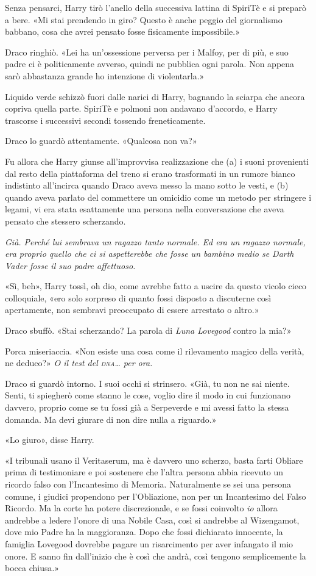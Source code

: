 Senza pensarci, Harry tirò l’anello della successiva lattina di SpiriTè e si preparò a bere. «Mi stai prendendo in giro? Questo è anche peggio del giornalismo babbano, cosa che avrei pensato fosse fisicamente impossibile.»

Draco ringhiò. «Lei ha un’ossessione perversa per i Malfoy, per di più, e suo padre ci è politicamente avverso, quindi ne pubblica ogni parola. Non appena sarò abbastanza grande ho intenzione di violentarla.»

Liquido verde schizzò fuori dalle narici di Harry, bagnando la sciarpa che ancora copriva quella parte. SpiriTè e polmoni non andavano d’accordo, e Harry trascorse i successivi secondi tossendo freneticamente.

Draco lo guardò attentamente. «Qualcosa non va?»

Fu allora che Harry giunse all’improvvisa realizzazione che (a) i suoni provenienti dal resto della piattaforma del treno si erano trasformati in un rumore bianco indistinto all’incirca quando Draco aveva messo la mano sotto le vesti, e (b) quando aveva parlato del commettere un omicidio come un metodo per stringere i legami, vi era stata esattamente una persona nella conversazione che aveva pensato che stessero scherzando.

\textit{Già. Perché lui sembrava un ragazzo tanto normale. Ed era un ragazzo normale, era proprio quello che ci si aspetterebbe che fosse un bambino medio se Darth Vader fosse il suo padre affettuoso.}

«Sì, beh», Harry tossì, oh dio, come avrebbe fatto a uscire da questo vicolo cieco colloquiale, «ero solo sorpreso di quanto fossi disposto a discuterne così apertamente, non sembravi preoccupato di essere arrestato o altro.»

Draco sbuffò. «Stai scherzando? La parola di \textit{Luna Lovegood} contro la mia?»

Porca miseriaccia. «Non esiste una cosa come il rilevamento magico della verità, ne deduco?» \textit{O il test del \textsc{dna}… per ora.}

Draco si guardò intorno. I suoi occhi si strinsero. «Già, tu non ne sai niente. Senti, ti spiegherò come stanno le cose, voglio dire il modo in cui funzionano davvero, proprio come se tu fossi già a Serpeverde e mi avessi fatto la stessa domanda. Ma devi giurare di non dire nulla a riguardo.»

«Lo giuro», disse Harry.

«I tribunali usano il Veritaserum, ma è davvero uno scherzo, basta farti Obliare prima di testimoniare e poi sostenere che l’altra persona abbia ricevuto un ricordo falso con l’Incantesimo di Memoria. Naturalmente se sei una persona comune, i giudici propendono per l’Obliazione, non per un Incantesimo del Falso Ricordo. Ma la corte ha potere discrezionale, e se fossi coinvolto \textit{io} allora andrebbe a ledere l’onore di una Nobile Casa, così si andrebbe al Wizengamot, dove mio Padre ha la maggioranza. Dopo che fossi dichiarato innocente, la famiglia Lovegood dovrebbe pagare un risarcimento per aver infangato il mio onore. E sanno fin dall’inizio che è così che andrà, così tengono semplicemente la bocca chiusa.»

